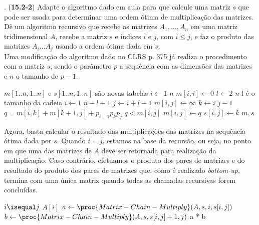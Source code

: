 
. (\textbf{15.2-2}) Adapte o algoritmo dado em aula para que calcule uma matriz $s$ que pode ser usada para determinar uma ordem ótima de multiplicação das matrizes. Dê um algoritmo recursivo que recebe as matrizes $A_1, \ldots, A_n$ em uma matriz tridimensional $A$, recebe a matriz $s$ e índices $i$ e $j$, com $i \leq j$, e faz o produto das matrizes $A_i \ldots A_j$ usando a ordem ótima dada em $s$.\\[6pt]

Uma modificação do algoritmo dado no CLRS p. 375 já realiza o procedimento com a matriz $s$, sendo o parâmetro $p$ a sequência com as dimensões das matrizes e $n$ o tamanho de $p - 1$.

\begin{codebox}
\li $m[1..n, 1..n]$ e $s[1..n, 1..n]$ são novas tabelas
\li \For $i \gets 1$ \To $n$
\li \Do
        $m[i, i] \gets 0$
\li     \For $l \gets 2$ \To $n$    \Comment l é o tamanho da cadeia
\li     \Do
            \For $i \gets 1$ \To $n - l +1$
\li         \Do
                $j \gets i + l - 1$
\li             $m[i, j] \gets \infty$
\li             \For $k \gets i$ \To $j - 1$
\li             \Do
                    $q = m[i, k] + m[k + 1, j] + p_{i-1} p_k p_j $
\li                 \If $q < m[i, j]$
\li                 \Then
                        $m[i, j] \gets q$
\li                     $s[i, j] \gets k$
                    \End
                \End
            \End
        \End
    \End
\li \Return $m, s$
\end{codebox}

Agora, basta calcular o resultado das multiplicações das matrizes na sequência ótima dada por $s$. Quando $i = j$, estamos na base da recursão, ou seja, no ponto em que uma das matrizes de $A$ deve ser retornada para realização da multiplicação. Caso contrário, efetuamos o produto dos pares de matrizes e do resultado do produto dos pares de matrizes que, como é realizado \textit{bottom-up}, termina com uma única matriz quando todas as chamadas recursivas forem concluídas. 

\begin{codebox}
\li \If $i \isequal j$
\li \Then
        \Return $A[i]$
\li \Else
        $a \gets \proc{Matrix-Chain-Multiply}(A, s, i, s[i, j])$
\li     $b \gets \proc{Matrix-Chain-Multiply}(A, s, s[i, j] + 1, j)$
\li     \Return a * b
    \End
\end{codebox}